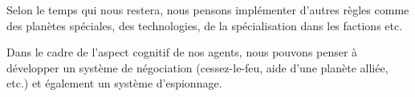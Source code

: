 \documentclass{article}
\begin{document}
    Selon le temps qui nous restera, nous pensons implémenter d'autres règles comme des planètes spéciales, des technologies, de la spécialisation dans les factions etc.

    Dans le cadre de l'aspect cognitif de nos agents, nous pouvons penser à développer un système de négociation (cessez-le-feu, aide d'une planète alliée, etc.) et également un système d'espionnage.
\end{document}
